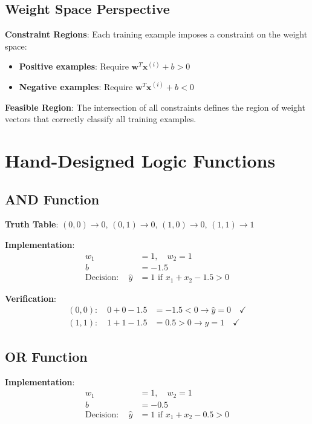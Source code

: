 \subsection{Weight Space Perspective}

\textbf{Constraint Regions}: Each training example imposes a constraint on the weight space:
\begin{itemize}
    \item \textbf{Positive examples}: Require $\bm{w}^T\bm{x}^{(i)} + b > 0$
    \item \textbf{Negative examples}: Require $\bm{w}^T\bm{x}^{(i)} + b < 0$
\end{itemize}

\textbf{Feasible Region}: The intersection of all constraints defines the region of weight vectors that correctly classify all training examples.

\section{Hand-Designed Logic Functions}

\subsection{AND Function}
\textbf{Truth Table}: $(0,0) \rightarrow 0$, $(0,1) \rightarrow 0$, $(1,0) \rightarrow 0$, $(1,1) \rightarrow 1$

\textbf{Implementation}:
\begin{align}
w_1 &= 1, \quad w_2 = 1 \\
b &= -1.5 \\
\text{Decision}: \quad \hat{y} &= 1 \text{ if } x_1 + x_2 - 1.5 > 0
\end{align}

\textbf{Verification}:
\begin{align}
(0,0): \quad 0 + 0 - 1.5 &= -1.5 < 0 \rightarrow \hat{y} = 0 \quad \checkmark \\
(1,1): \quad 1 + 1 - 1.5 &= 0.5 > 0 \rightarrow \hat{y} = 1 \quad \checkmark
\end{align}

\subsection{OR Function}
\textbf{Implementation}:
\begin{align}
w_1 &= 1, \quad w_2 = 1 \\
b &= -0.5 \\
\text{Decision}: \quad \hat{y} &= 1 \text{ if } x_1 + x_2 - 0.5 > 0
\end{align}

